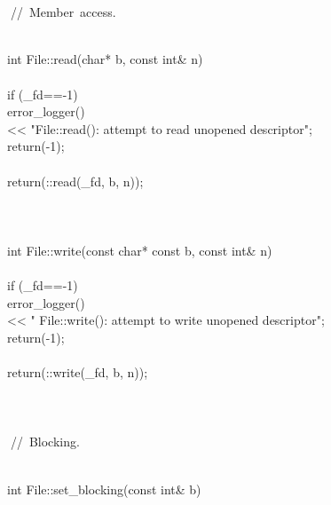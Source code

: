 \documentclass{article}
\begin{document}
\\
 
\\
 
\hbox{// Member access.}\strut\\
 int File::read(char* b, const int& n)
\\
 {
\\
         if (_fd==-1) {
\\
                 error_logger() 
\\
                         << "File::read(): attempt to read unopened descriptor\n";
\\
                 return(-1);
\\
         }
\\
         return(::read(_fd, b, n));
\\
 }
\\
 
\\
 
\\
 int File::write(const char* const b, const int& n)
\\
 {
\\
         if (_fd==-1) {
\\
                 error_logger() 
\\
                         << "     File::write(): attempt to write unopened descriptor\n";
\\
                 return(-1);
\\
         }
\\
         return(::write(_fd, b, n));
\\
 }
\\
 
\\
 
\\
 
\hbox{// Blocking.}\strut\\
 int File::set_blocking(const int& b)
\\
\end{document}
